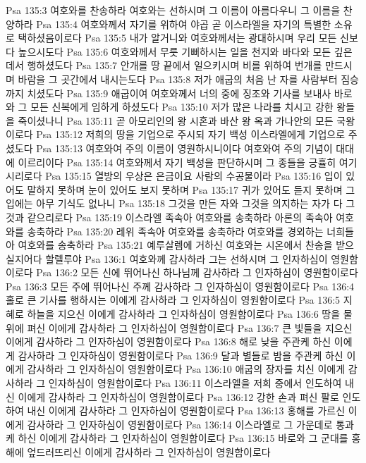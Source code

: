 Psa 135:3  여호와를 찬송하라 여호와는 선하시며 그 이름이 아름다우니 그 이름을 찬양하라
Psa 135:4  여호와께서 자기를 위하여 야곱 곧 이스라엘을 자기의 특별한 소유로 택하셨음이로다
Psa 135:5  내가 알거니와 여호와께서는 광대하시며 우리 모든 신보다 높으시도다
Psa 135:6  여호와께서 무릇 기뻐하시는 일을 천지와 바다와 모든 깊은데서 행하셨도다
Psa 135:7  안개를 땅 끝에서 일으키시며 비를 위하여 번개를 만드시며 바람을 그 곳간에서 내시는도다
Psa 135:8  저가 애굽의 처음 난 자를 사람부터 짐승까지 치셨도다
Psa 135:9  애굽이여 여호와께서 너의 중에 징조와 기사를 보내사 바로와 그 모든 신복에게 임하게 하셨도다
Psa 135:10  저가 많은 나라를 치시고 강한 왕들을 죽이셨나니
Psa 135:11  곧 아모리인의 왕 시혼과 바산 왕 옥과 가나안의 모든 국왕이로다
Psa 135:12  저희의 땅을 기업으로 주시되 자기 백성 이스라엘에게 기업으로 주셨도다
Psa 135:13  여호와여 주의 이름이 영원하시니이다 여호와여 주의 기념이 대대에 이르리이다
Psa 135:14  여호와께서 자기 백성을 판단하시며 그 종들을 긍휼히 여기시리로다
Psa 135:15  열방의 우상은 은금이요 사람의 수공물이라
Psa 135:16  입이 있어도 말하지 못하며 눈이 있어도 보지 못하며
Psa 135:17  귀가 있어도 듣지 못하며 그 입에는 아무 기식도 없나니
Psa 135:18  그것을 만든 자와 그것을 의지하는 자가 다 그것과 같으리로다
Psa 135:19  이스라엘 족속아 여호와를 송축하라 아론의 족속아 여호와를 송축하라
Psa 135:20  레위 족속아 여호와를 송축하라 여호와를 경외하는 너희들아 여호와를 송축하라
Psa 135:21  예루살렘에 거하신 여호와는 시온에서 찬송을 받으실지어다 할렐루야
Psa 136:1  여호와께 감사하라 그는 선하시며 그 인자하심이 영원함이로다
Psa 136:2  모든 신에 뛰어나신 하나님께 감사하라 그 인자하심이 영원함이로다
Psa 136:3  모든 주에 뛰어나신 주께 감사하라 그 인자하심이 영원함이로다
Psa 136:4  홀로 큰 기사를 행하시는 이에게 감사하라 그 인자하심이 영원함이로다
Psa 136:5  지혜로 하늘을 지으신 이에게 감사하라 그 인자하심이 영원함이로다
Psa 136:6  땅을 물 위에 펴신 이에게 감사하라 그 인자하심이 영원함이로다
Psa 136:7  큰 빛들을 지으신 이에게 감사하라 그 인자하심이 영원함이로다
Psa 136:8  해로 낮을 주관케 하신 이에게 감사하라 그 인자하심이 영원함이로다
Psa 136:9  달과 별들로 밤을 주관케 하신 이에게 감사하라 그 인자하심이 영원함이로다
Psa 136:10  애굽의 장자를 치신 이에게 감사하라 그 인자하심이 영원함이로다
Psa 136:11  이스라엘을 저희 중에서 인도하여 내신 이에게 감사하라 그 인자하심이 영원함이로다
Psa 136:12  강한 손과 펴신 팔로 인도하여 내신 이에게 감사하라 그 인자하심이 영원함이로다
Psa 136:13  홍해를 가르신 이에게 감사하라 그 인자하심이 영원함이로다
Psa 136:14  이스라엘로 그 가운데로 통과케 하신 이에게 감사하라 그 인자하심이 영원함이로다
Psa 136:15  바로와 그 군대를 홍해에 엎드러뜨리신 이에게 감사하라 그 인자하심이 영원함이로다
